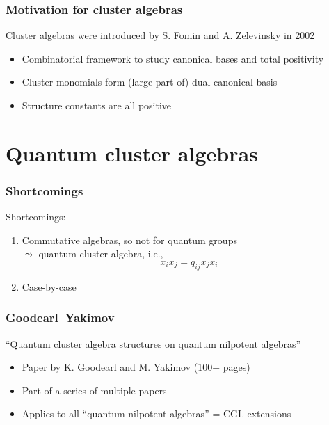 \documentclass[aspectratio=169]{beamer}
\begin{document}
\begin{frame}
	\frametitle{Motivation for cluster algebras}

	Cluster algebras were introduced by S. Fomin and A. Zelevinsky in 2002
	\begin{itemize}
		\item Combinatorial framework to study canonical bases and total positivity
		\item Cluster monomials form (large part of) dual canonical basis
		\item Structure constants are all positive
	\end{itemize}
\end{frame}

\section{Quantum cluster algebras}

\begin{frame}
	\frametitle{Shortcomings}

	Shortcomings:
	\begin{enumerate}
		\item Commutative algebras, so not for quantum groups\\ \pause $\leadsto$ quantum cluster algebra,
		      i.e.,
		      \begin{equation*}
			      x_i x_j = q_{ij} x_j x_i
		      \end{equation*}%
		      \pause
		\item Case-by-case
	\end{enumerate}

\end{frame}

\begin{frame}
	\frametitle{Goodearl--Yakimov}

	\begin{center}
		``Quantum cluster algebra structures on quantum nilpotent algebras''
	\end{center}
	\begin{itemize}
		\item Paper by K. Goodearl and M. Yakimov (100+ pages)
		\item Part of a series of multiple papers
		\item Applies to all ``quantum nilpotent algebras'' = CGL extensions
	\end{itemize}

\end{frame}
\end{document}
